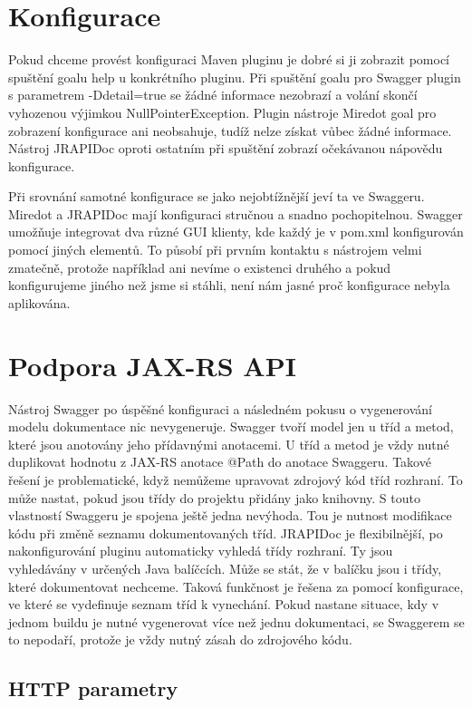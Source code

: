 \documentclass[11pt,twoside,a4paper]{book}
\begin{document}
\section{Konfigurace}

Pokud chceme provést konfiguraci Maven pluginu je dobré si ji zobrazit pomocí spuštění
goalu help u konkrétního pluginu. Při spuštění goalu pro Swagger plugin s parametrem
-Ddetail=true se žádné informace nezobrazí a volání skončí vyhozenou výjimkou
NullPointerException. Plugin nástroje Miredot goal pro zobrazení konfigurace ani
neobsahuje, tudíž nelze získat vůbec žádné informace. Nástroj JRAPIDoc oproti
ostatním při spuštění zobrazí očekávanou nápovědu konfigurace.

Při srovnání samotné konfigurace se jako nejobtížnější jeví ta ve Swaggeru. Miredot a
JRAPIDoc mají konfiguraci stručnou a snadno pochopitelnou. Swagger umožňuje
integrovat dva různé GUI klienty, kde každý je v pom.xml konfigurován pomocí
jiných elementů. To působí při prvním kontaktu s nástrojem velmi zmatečně,
protože například ani nevíme o existenci druhého a pokud konfigurujeme jiného
než jsme si stáhli, není nám jasné proč konfigurace nebyla aplikována.

\section{Podpora JAX-RS API}

Nástroj Swagger po úspěšné konfiguraci a následném pokusu o vygenerování modelu
dokumentace nic nevygeneruje. Swagger tvoří model jen u tříd a metod, které
jsou anotovány jeho přídavnými anotacemi. U tříd a metod je vždy nutné
duplikovat hodnotu z JAX-RS anotace @Path do anotace Swaggeru. Takové řešení je
problematické, když nemůžeme upravovat zdrojový kód tříd rozhraní. To může
nastat, pokud jsou třídy do projektu přidány jako knihovny. S touto vlastností
Swaggeru je spojena ještě jedna nevýhoda. Tou je nutnost modifikace kódu při změně seznamu
dokumentovaných tříd. JRAPIDoc je flexibilnější, po nakonfigurování pluginu automaticky vyhledá třídy rozhraní.
Ty jsou vyhledávány v určených Java balíčcích. Může se stát, že v balíčku jsou i třídy, které
dokumentovat nechceme. Taková funkčnost je řešena za pomocí konfigurace, ve
které se vydefinuje seznam tříd k vynechání. Pokud nastane situace, kdy v jednom
buildu je nutné vygenerovat více než jednu dokumentaci, se Swaggerem se to
nepodaří, protože je vždy nutný zásah do zdrojového kódu.

\subsection{HTTP parametry}
\end{document}
